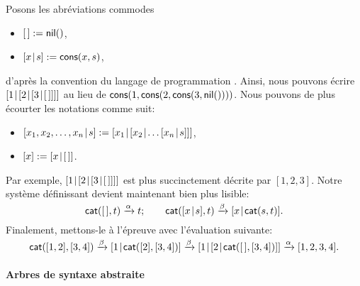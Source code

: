 Posons les abréviations commodes
\begin{itemize}

  \item \([\,] := \textsf{nil}()\),

  \item \([{x}\!\mid\!{s}] := \textsf{cons}(x,s)\),

\end{itemize}
d'après la convention du langage de programmation \Prolog
\citep{SterlingShapiro_1994,Bratko_2000}. Ainsi, nous pouvons écrire
\([{1}\!\mid\!{[{2}\!\mid\!{[{3}\!\mid\!{[\,]}]}]}]\) au lieu de
\(\textsf{cons}(1,\textsf{cons}(2,\textsf{cons}(3,\textsf{nil}())))\). Nous
pouvons de plus écourter les notations comme suit:
\begin{itemize}

  \item \(\cons{x_1,x_2,\dots,x_n}{s} := \cons{x_1}{\cons{x_2}{\dots
      \cons{x_n}{s}}}\),

  \item \([x] := [{x}\!\mid\!{[\,]}]\).

\end{itemize}
Par exemple, \([{1}\!\mid\!{[{2}\!\mid\!{[{3}\!\mid\!{[\,]}]}]}]\) est plus
succinctement décrite par \([1,2,3]\). Notre système définissant
 devient maintenant bien plus
lisible:
\begin{equation}
\fun{cat}(        \el,t) \xrightarrow{\smash{\alpha}} t;\qquad
\fun{cat}(\cons{x}{s},t) \xrightarrow{\smash{\beta}}
\cons{x}{\fun{cat}(s,t)}.
\label{def:cat}\index{pile!concaténation!définition}
\end{equation}
Finalement, mettons-le à l'épreuve avec l'évaluation suivante:
\begin{equation*}
\textsf{cat}([1,2],[3,4])
\xrightarrow{\smash{\beta}}
[{1}\!\mid\!{\textsf{cat}([2],[3,4])}]
\xrightarrow{\smash{\beta}}
[{1}\!\mid\!{[{2}\!\mid\!{\textsf{cat}([\,],[3,4])}]}]
\xrightarrow{\smash{\alpha}}
[1,2,3,4].
\end{equation*}

\paragraph{Arbres de syntaxe abstraite}

